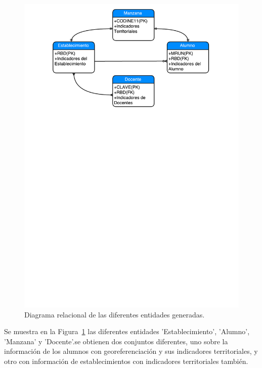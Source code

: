 \begin{figure}[H]
  \centering
    \includegraphics[trim=2cm 20cm 0cm 0cm,scale=0.9]{Figuras/6SolucionPropuesta/relacionDatos.pdf}
      \caption{Diagrama relacional de las diferentes entidades generadas.}
    \label{fig:rel}
\end{figure}

Se muestra en la Figura~\ref{fig:rel} las diferentes entidades 'Establecimiento', 'Alumno', 'Manzana' y 'Docente'.se obtienen dos conjuntos diferentes, uno sobre la información de los alumnos con georeferenciación y sus indicadores territoriales, y otro con información de establecimientos con indicadores territoriales también.

